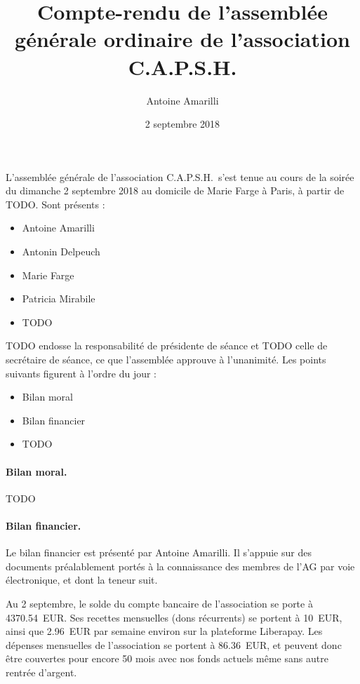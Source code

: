 \documentclass{scrartcl}
\title{Compte-rendu de l'assemblée générale ordinaire de l'association C.A.P.S.H.}
\author{Antoine Amarilli}
\date{2 septembre 2018}
\begin{document}
\maketitle

L'assemblée générale de l'association C.A.P.S.H.\ s'est tenue au cours de la
soirée du dimanche 2 septembre 2018 au domicile de Marie Farge à Paris, à partir
de
TODO.
% 
Sont présents :

\medskip

\begin{itemize}
\item Antoine Amarilli
\item Antonin Delpeuch
\item Marie Farge
\item Patricia Mirabile
\item TODO
\end{itemize}

\medskip

TODO endosse la responsabilité de présidente de séance et TODO celle de secrétaire de séance, ce que l'assemblée approuve à l'unanimité.
Les points suivants figurent à l'ordre
du jour :

\medskip

\begin{itemize}
\item Bilan moral
\item Bilan financier
\item TODO
\end{itemize}

\paragraph{Bilan moral.} 
TODO

\paragraph{Bilan financier.} Le bilan financier est présenté par Antoine
Amarilli. Il s'appuie sur des documents préalablement portés à la connaissance des
membres de l'AG par voie électronique, et dont la teneur suit.

Au 2 septembre, le solde du compte bancaire de l'association se porte à
4370.54~EUR. Ses recettes mensuelles (dons récurrents) se portent à 10~EUR,
ainsi que 2.96~EUR par semaine environ sur la plateforme Liberapay. Les dépenses
mensuelles de l'association se portent à 86.36~EUR, et peuvent donc être
couvertes pour encore 50 mois avec nos fonds actuels même sans autre rentrée
d'argent.
 
\end{document}
